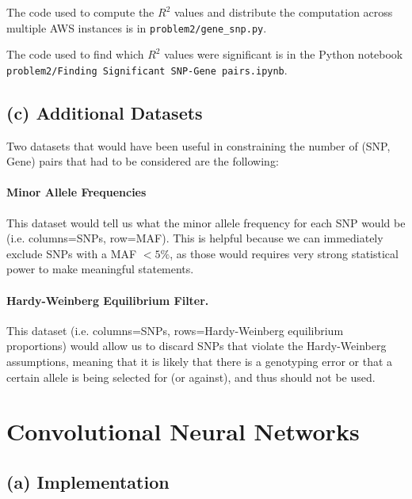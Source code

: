 \documentclass{article}[11pt]
\begin{document}
The code used to compute the $R^2$ values and distribute
the computation across multiple AWS instances is
in {\tt problem2/gene\_snp.py}.

The code used to find which $R^2$ values were
significant is in the Python notebook
{\tt problem2/Finding Significant SNP-Gene pairs.ipynb}.

\subsection*{(c) Additional Datasets}

Two datasets that would have been useful in
constraining the number of (SNP, Gene) pairs
that had to be considered are the following:

\paragraph{Minor Allele Frequencies}
This dataset would tell us what the minor allele frequency
for each SNP would be (i.e. columns=SNPs, row=MAF).
This is helpful because we can immediately exclude
SNPs with a MAF $< 5\%$,
as those would requires very strong statistical power to
make meaningful statements.

\paragraph{Hardy-Weinberg Equilibrium Filter.}

This dataset (i.e. columns=SNPs,
rows=Hardy-Weinberg
equilibrium proportions) would allow us to discard
SNPs that violate the Hardy-Weinberg assumptions,
meaning that it is likely that there is a genotyping
error or that a certain allele is being selected for (or
against), and thus should not be used.

\section{Convolutional Neural Networks}
\subsection*{(a) Implementation}
\end{document}
